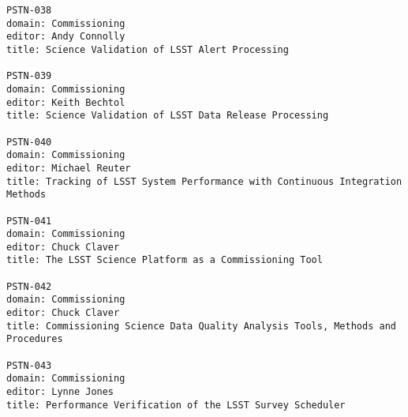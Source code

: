 \begin{verbatim}
PSTN-038
domain: Commissioning
editor: Andy Connolly
title: Science Validation of LSST Alert Processing

PSTN-039
domain: Commissioning
editor: Keith Bechtol
title: Science Validation of LSST Data Release Processing

PSTN-040
domain: Commissioning
editor: Michael Reuter
title: Tracking of LSST System Performance with Continuous Integration Methods

PSTN-041
domain: Commissioning
editor: Chuck Claver
title: The LSST Science Platform as a Commissioning Tool

PSTN-042
domain: Commissioning
editor: Chuck Claver
title: Commissioning Science Data Quality Analysis Tools, Methods and Procedures

PSTN-043
domain: Commissioning
editor: Lynne Jones
title: Performance Verification of the LSST Survey Scheduler


\end{verbatim}
